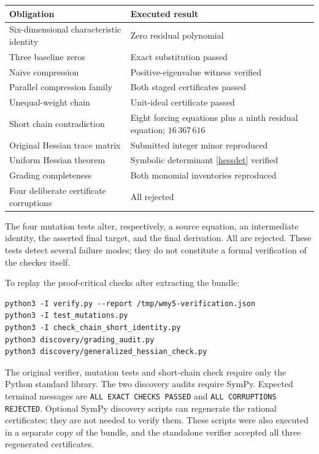 \documentclass[11pt,a4paper]{article}
\theoremstyle{remark}\newtheorem{remark}[theorem]{Remark}
\begin{document}
\begin{center}\small
\begin{tabular}{@{}p{}p{}@{}}\toprule
Obligation & Executed result\\\midrule
Six-dimensional characteristic identity & Zero residual polynomial\\
Three baseline zeros & Exact substitution passed\\
Naive compression & Positive-eigenvalue witness verified\\
Parallel compression family & Both staged certificates passed\\
Unequal-weight chain & Unit-ideal certificate passed\\
Short chain contradiction & Eight forcing equations plus a ninth residual equation; $16\,367\,616$\\
Original Hessian trace matrix & Submitted integer minor reproduced\\
Uniform Hessian theorem & Symbolic determinant \eqref{hessdet} verified\\
Grading completeness & Both monomial inventories reproduced\\
Four deliberate certificate corruptions & All rejected\\\bottomrule
\end{tabular}
\end{center}

The four mutation tests alter, respectively, a source equation, an intermediate
identity, the asserted final target, and the final derivation. All are rejected.
These tests detect several failure modes; they do not constitute a formal
verification of the checker itself.

To replay the proof-critical checks after extracting the bundle:
\begin{verbatim}
python3 -I verify.py --report /tmp/wmy5-verification.json
python3 -I test_mutations.py
python3 -I check_chain_short_identity.py
python3 discovery/grading_audit.py
python3 discovery/generalized_hessian_check.py
\end{verbatim}
The original verifier, mutation tests and short-chain check require only the
Python standard library. The two discovery audits require SymPy. Expected
terminal messages are
\texttt{ALL EXACT CHECKS PASSED} and \texttt{ALL CORRUPTIONS REJECTED}.
Optional SymPy discovery scripts can regenerate the rational certificates;
they are not needed to verify them. These scripts were also executed in a
separate copy of the bundle, and the standalone verifier accepted all three
regenerated certificates.
\end{document}
